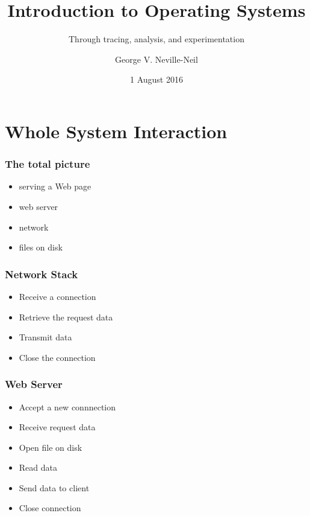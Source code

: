 
\usepackage[english]{babel}
\usepackage[latin1]{inputenc}
\usepackage{graphicx}
\usepackage{times}
\usepackage[T1]{fontenc}
\usepackage{fancyvrb}
\usepackage{listings}


\title{Introduction to Operating Systems}
\subtitle{Through tracing, analysis, and experimentation}
\author{George V. Neville-Neil}
\date{1 August 2016}

\begin{frame}
  \titlepage
\end{frame}

\section{Whole System Interaction}
\label{sec:whole}

\begin{frame}
  \frametitle{The total picture}
  \begin{itemize}
  \item serving a Web page
  \item web server
  \item network 
  \item files on disk
  \end{itemize}
\end{frame}

\begin{frame}
  \frametitle{Network Stack}
  \begin{itemize}
  \item Receive a connection
  \item Retrieve the request data
  \item Transmit data
  \item Close the connection
  \end{itemize}
\end{frame}

\begin{frame}
  \frametitle{Web Server}
  \begin{itemize}
  \item Accept a new connnection
  \item Receive request data
  \item Open file on disk
  \item Read data
  \item Send data to client
  \item Close connection
  \end{itemize}
\end{frame}

